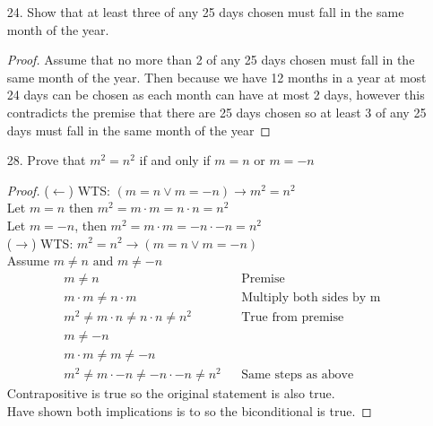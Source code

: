 \begin{itemize}
    \item[24.] Show that at least three of any 25 days chosen must fall in the same month of the year.
          \begin{proof}
            Assume that no more than 2 of any 25 days chosen must fall in the same month of the year.
             Then because we have 12 months in a year at most 24 days can be chosen as each month can
             have at most 2 days, however this contradicts the premise that there are 25 days chosen so at least 3 of any 25 days must fall in the same month of the year
          \end{proof}
    \item[28.] Prove that $m^2 = n^2$ if and only if $m = n$ or $m = -n$ 
          \begin{proof}
            ($\leftarrow$) WTS: $(m=n \lor m=-n) \to m^2=n^2$ \\
            Let $m = n$ then $m^2 = m \cdot m = n \cdot n = n^2$ \\
            Let $m = -n$, then $m^2 = m \cdot m = -n \cdot -n = n^2$\\
            ($\to$) WTS: $m^2 = n^2 \to (m = n \lor m = -n)$\\ 
            Assume $m \neq n \text{ and } m \neq -n$
            \begin{align*}
            m \neq n && \text{Premise}\\
            m \cdot m \neq n \cdot m  &&\text{Multiply both sides by m}\\
            m^2 \neq m \cdot n \neq n \cdot n \neq n^2 &&\text{True from premise}\\
            m \neq -n\\
            m \cdot m \neq m \neq -n\\
            m^2 \neq m \cdot -n \neq -n \cdot -n \neq n^2 &&\text{Same steps as above}
            \end{align*}
            Contrapositive is true so the original statement is also true.\\
            Have shown both implications is to so the biconditional is true.
          \end{proof}
\end{itemize}